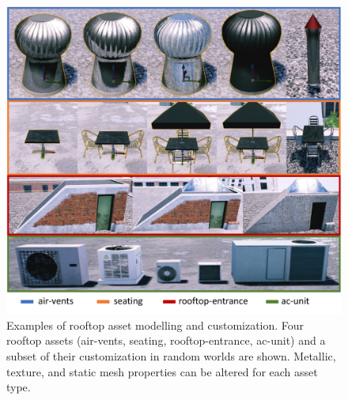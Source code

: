 \begin{figure}[ht!]
\centering
\includegraphics[width=.60\linewidth]{chapter_6_landingsim/figs/assets_all.pdf}
\caption[Examples of rooftop asset modelling and customization]{Examples of rooftop asset modelling and customization. Four rooftop assets (air-vents, seating, rooftop-entrance, ac-unit) and a subset of their customization in random worlds are shown. Metallic, texture, and static mesh properties can be altered for each asset type.  }
\label{fig:ch6_all_assets}
\end{figure}


